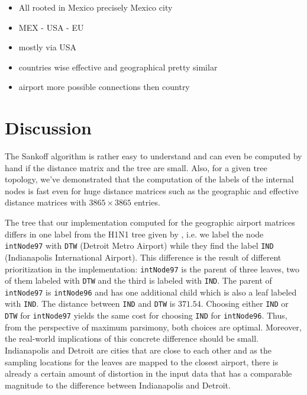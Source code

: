 \documentclass{article}
\begin{document}
\begin{itemize}
    \item All rooted in Mexico precisely Mexico city
    \item MEX - USA - EU
    \item mostly via USA
    \item countries wise effective and geographical pretty similar
    \item airport more possible connections then country
\end{itemize}


\section{Discussion}
The Sankoff algorithm is rather easy to understand and can even be computed by
hand if the distance matrix and the tree are small. Also, for a given tree
topology, we've demonstrated that the computation of the labels of the internal
nodes is fast even for huge distance matrices such as the geographic and
effective distance matrices with $3865 \times 3865$ entries.

The tree that our implementation computed for the geographic airport matrices
differs in one label from the H1N1 tree given by
\cite{reimeringPhylogeographicReconstructionUsing2020}, i.e. we label the node
\texttt{intNode97} with \texttt{DTW} (Detroit Metro Airport) while they find the label
\texttt{IND} (Indianapolis International Airport).
This difference is the result of different prioritization in the implementation:
\texttt{intNode97} is the parent of three leaves, two of them labeled with
\texttt{DTW} and the third is labeled with \texttt{IND}. The parent of
\texttt{intNode97} is \texttt{intNode96} and has one additional child which is
also a leaf labeled with \texttt{IND}. The distance between \texttt{IND}
and \texttt{DTW} is $371.54$. Choosing either \texttt{IND} or \texttt{DTW} for
\texttt{intNode97} yields the same cost for choosing \texttt{IND} for
\texttt{intNode96}. Thus, from the perspective of maximum parsimony, both
choices are optimal. Moreover, the real-world implications of this concrete
difference should be small. Indianapolis and Detroit are cities that are close
to each other and as the sampling locations for the leaves are mapped to the
closest airport, there is already a certain amount of distortion
 in the input data that has a comparable magnitude to
the difference between Indianapolis and Detroit.
\end{document}
